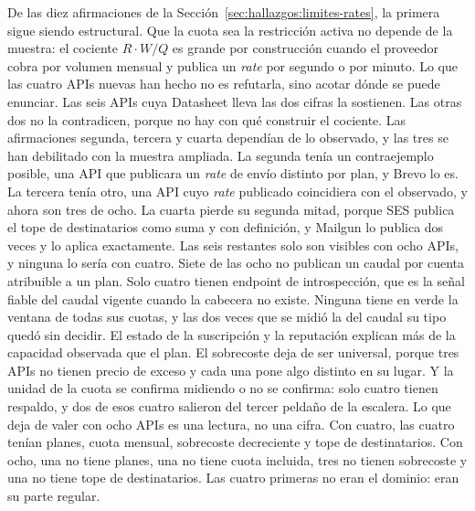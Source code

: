 De las diez afirmaciones de la
Sección~\ref{sec:hallazgos:limites-rates}, la primera sigue siendo estructural.
Que la cuota sea la restricción activa no depende de la muestra: el cociente $R
\cdot W / Q$ es grande por construcción cuando el proveedor cobra por volumen
mensual y publica un \textit{rate} por segundo o por minuto. Lo que las cuatro
APIs nuevas han hecho no es refutarla, sino acotar dónde se puede enunciar. Las
seis APIs cuya Datasheet lleva las dos cifras la sostienen. Las otras dos no la
contradicen, porque no hay con qué construir el cociente.
Las afirmaciones segunda, tercera y cuarta dependían de lo observado, y las
tres se han debilitado con la muestra ampliada. La segunda tenía un
contraejemplo posible, una API que publicara un \textit{rate} de envío distinto
por plan, y Brevo lo es. La tercera tenía otro, una API cuyo \textit{rate}
publicado coincidiera con el observado, y ahora son tres de ocho. La cuarta pierde su
segunda mitad, porque SES publica el tope de destinatarios como suma y con
definición, y Mailgun lo publica dos veces y lo aplica exactamente.
Las seis restantes solo son visibles con ocho APIs, y ninguna lo sería con
cuatro. Siete de las ocho no publican un caudal por cuenta atribuible a un
plan. Solo cuatro tienen endpoint de introspección, que es la señal
fiable del caudal vigente cuando la cabecera no existe. Ninguna tiene en verde la ventana
de todas sus cuotas, y las dos veces que se midió la del caudal su
tipo quedó sin decidir. El estado de la suscripción y la reputación explican más de la capacidad
observada que el plan. El sobrecoste deja de ser universal, porque tres APIs no
tienen precio de exceso y cada una pone algo distinto en su lugar. Y la unidad
de la cuota se confirma midiendo o no se confirma: solo cuatro tienen respaldo,
y dos de esos cuatro salieron del tercer peldaño de la escalera.
Lo que deja de valer con ocho APIs es una lectura, no una cifra. Con cuatro,
las cuatro tenían planes, cuota mensual, sobrecoste decreciente y tope de
destinatarios. Con ocho, una no tiene planes, una no tiene cuota incluida, tres
no tienen sobrecoste y una no tiene tope de destinatarios. Las cuatro primeras
no eran el dominio: eran su parte regular.

